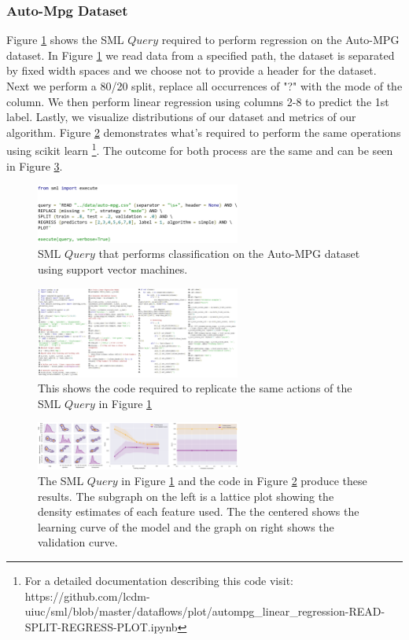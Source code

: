 \documentclass[jair,twoside,11pt,theapa]{article}
\begin{document}
\subsubsection{Auto-Mpg Dataset}
Figure \ref{fig:SML:AutoMPGQuery} shows the SML \(Query\) required to perform regression on the Auto-MPG dataset. In Figure \ref{fig:SML:AutoMPGQuery} we read data from a specified path, the dataset is separated by fixed width spaces and we choose not to provide a header for the dataset.  Next we perform a 80/20 split, replace all occurrences of "?" with the mode of the column. We then perform linear regression using columns 2-8 to predict the 1st label. Lastly, we visualize distributions of our dataset and metrics of our algorithm. Figure \ref{fig:Manual:Auto-MPG} demonstrates what's required to perform the same operations using scikit learn \footnote{For a detailed documentation describing this code visit: https://github.com/lcdm-uiuc/sml/blob/master/dataflows/plot/autompg\_linear\_regression-READ-SPLIT-REGRESS-PLOT.ipynb}. The outcome for both process are the same and can be seen in Figure \ref{fig:AutoMPG:Results}.

\begin{figure}
\includegraphics[width=0.6\textwidth]{figs/autompg_sml.png}
\centering
\caption{SML \(Query\) that performs classification on the Auto-MPG dataset using support vector machines.}
\label{fig:SML:AutoMPGQuery}
\end{figure}

\begin{figure}
\includegraphics[width=0.6\textwidth]{figs/auto-mpg_manual.png}
\centering
\caption{This shows the code required to replicate the same actions of the SML \(Query\) in Figure \ref{fig:SML:AutoMPGQuery}}
\label{fig:Manual:Auto-MPG}
\end{figure}

\begin{figure}
\includegraphics[width=0.6\textwidth]{figs/auto-mpg-results.png}
\centering
\caption{The SML \(Query\) in Figure \ref{fig:SML:AutoMPGQuery}  and the code in Figure \ref{fig:Manual:Auto-MPG} produce these results. The subgraph on the left is a lattice plot showing the density estimates of each feature used. The the centered shows the learning curve of the model and the graph on right shows the validation curve.}
\label{fig:AutoMPG:Results}
\end{figure}
\end{document}
